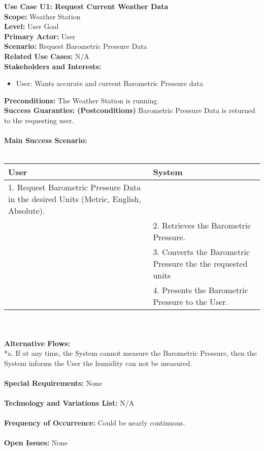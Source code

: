 \documentclass[letterpaper]{article}
\begin{document}
\noindent
\textbf{Use Case U1:  Request Current Weather Data}\\
\textbf{Scope:  }Weather Station\\
\textbf{Level:  }User Goal\\
\textbf{Primary Actor:  }User\\
\textbf{Scenario:  }Request Barometric Pressure Data\\
\textbf{Related Use Cases:  }N/A\\
\textbf{Stakeholders and Interests:}
\begin{itemize}
\item User:  Wants accurate and current Barometric Pressure data
\end{itemize}
\textbf{Preconditions:  }The Weather Station is running.\\
\textbf{Success Guaranties:  (Postconditions)} 
Barometric Pressure Data is returned to the requesting user.\\\\
\textbf{Main Success Scenario: }\\\\
\begin{tabular}{|p{6cm}|p{6cm}|}\hline
\textbf{User} & \textbf{System}\\\hline
1.  Request Barometric Pressure Data in the desired Units (Metric,
English, Absolute). 
& \\\hline
&2.  Retrieves the Barometric Pressure.\\\hline
&3.  Converts the Barometric Pressure the the requested units\\\hline
&4.  Presents the Barometric Pressure to the User.\\\hline
\end{tabular}\\\\
\textbf{Alternative Flows:  }\\
*a.  If at any time, the System cannot measure the Barometric Pressure,
then the System informs the User the humidity can not be measured.\\\\
\textbf{Special Requirements:  }None\\\\
\textbf{Technology and Variations List:  } N/A\\\\
\textbf{Frequency of Occurrence:  }Could be nearly continuous.\\\\
\textbf{Open Issues:  }None
\end{document}
